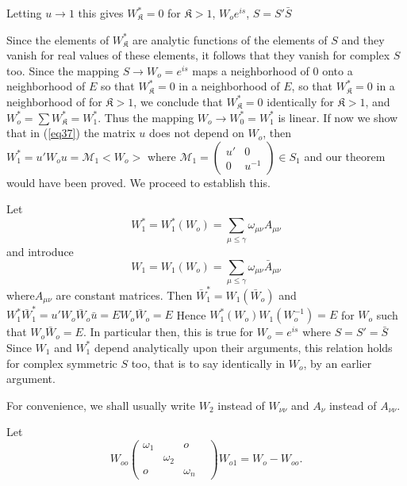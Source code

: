  Letting $u \to 1$ this gives $W^*_{\mathfrak{K}} = 0$ for $\mathfrak{K}
 > 1$, $W_o e^{is}$, $S=S'\bar{S}$ 
 
 Since the elements of $W^*_{\mathfrak{K}}$ are analytic functions of the
 elements of $S$ and they vanish for real values of these elements, it
 follows that they vanish for complex $S$ too. Since the mapping $S
 \to W_o = e^{is}$ maps a neighborhood of $0$ onto a neighborhood of
 $E$ so that $W^*_{\mathfrak{K}} = 0$ in a neighborhood of $E$,  so that
 $W^* _{\mathfrak{K}} =0$ in a neighborhood of for $\mathfrak{K} > 1$,
 we conclude that $W^*_\mathfrak{K}=0$ identically for $\mathfrak{K} >
 1$, and $W^*_o = \sum W^*_\mathfrak{K} =W^*_1 $. Thus the mapping $W_o
 \to W^\ast_0 = W^*_1$ is linear. If now we show that in (\ref{eq37}) the
 matrix $u$ does not depend on $W_o$, then $W ^*_1 = u' W_o u =
 \mathcal{M}_1 <W_o>$ where 
 $\mathcal{M}_1 = \begin{pmatrix} u' & 0\\0 & u^{-1}\end{pmatrix} \in
 S_1$ and our theorem would have been proved. We proceed to establish
 this. 
 
 Let
 \begin{equation*}
W^*_1 = W^*_1 (W_o) = \sum_{\mu \leq \gamma} \omega _{\mu \nu} A_{\mu \nu} 
\tag{39}\label{eq39} 
 \end{equation*} 
 and introduce
 \begin{equation*}
W_1 = W_1 (W_o) = \sum_{\mu \leq \gamma} \omega _{\mu \nu} \bar{A}_{\mu \nu}
\tag{40}\label{eq40} 
 \end{equation*} 
 where\pageoriginale $A_{\mu \nu}$ are constant matrices. Then
 $\bar{W}^*_1 = W_1 
 (\bar{W}_o)$ and $W^*_1 \bar{W}^*_1 = u' W_o \bar{W}_o \bar{u} = E
 W_o \bar{W}_o=E $ Hence $W^*_1 (W_o) W_1 (W^{-1}_o) = E$ for $W_o$
 such that $W_o \bar{W}_o = E$. In particular then, this is true for
 $W_o = e^{is}$ where $S=S' = \bar{S}$ Since $W_1 $ and $W^*_1$ depend
 analytically upon their arguments, this relation holds for complex
 symmetric $S$ too, that is to say identically in $W_o$, by an earlier
 argument.   
 
 For convenience, we shall usually write $W_2$ instead of $W_{\nu\nu}$
 and $A_\nu$ instead of $A_{\nu \nu}$.  
 
 Let
 $$
 W_{oo} \begin{pmatrix} \omega_1 & & o \\ & \omega_2 & & \\ o & & 
   \omega_n\end{pmatrix} W_{o1} = W_o - W_{oo}. 
 $$
 
